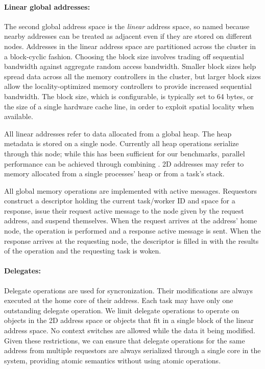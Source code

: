 \paragraph{Linear global addresses:} The second global address space is the {\em linear} address space, so
named because nearby addresses can be treated as adjacent even if they
are stored on different nodes. Addresses in the linear address space
are partitioned across the cluster in a block-cyclic fashion. Choosing
the block size involves trading off sequential bandwidth against
aggregate random access bandwidth. Smaller block sizes help spread
data across all the memory controllers in the cluster, but larger
block sizes allow the locality-optimized memory controllers to provide
increased sequential bandwidth. The block size, which is configurable, is typically set to 64
bytes, or the size of a single hardware cache line, in order to
exploit spatial locality when available.

All linear addresses refer to data allocated from a global heap. The
heap metadata is stored on a single node. Currently all heap
operations serialize through this node; while this has been sufficient
for our benchmarks, parallel performance can be achieved through
combining . 2D addresses may
refer to memory allocated from a single processes' heap or from a
task's stack.


All global memory operations are implemented with active
messages. Requestors construct a descriptor holding the current
task/worker ID and space for a response, issue their request active
message to the node given by the request address, and suspend
themselves. When the request arrives at the address' home node, the
operation is performed and a response active message is sent. When the
response arrives at the requesting node, the descriptor is filled in
with the results of the operation and the requesting task is woken.

\paragraph{Delegates:} Delegate operations are used for syncronization. Their modifications
are always executed at the home core of their address. Each task may
have only one outstanding delegate operation. We limit delegate
operations to operate on objects in the 2D address space or objects that
fit in a single block of the linear address space. No context switches
are allowed while the data it being modified. Given these
restrictions, we can ensure that delegate operations for the same address from multiple
requestors are always serialized through a single core in the system,
providing atomic semantics without using atomic operations.

